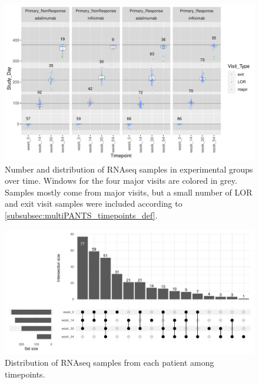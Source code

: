 \begin{figure}
    \centering
    \includegraphics[width=1.0\textwidth,page=1]{mainmatter/figures/chapter_04/process_pheno.pheno_filtered_dge.Study_Day_vs_Visit_Label.pdf}
    \caption{Number and distribution of \gls{RNAseq} samples in experimental groups over time. Windows for the four major visits are colored in grey. Samples mostly come from major visits, but a small number of \gls{LOR} and exit visit samples were included according to \autoref{subsubsec:multiPANTS_timepoints_def}.}
    \label{fig:multipants_studyDay_boxplots}
\end{figure}

\begin{figure}
    \centering
    \includegraphics[width=1.0\textwidth,page=1]{mainmatter/figures/chapter_04/process_pheno.pheno_filtered_dge.Visit_Label_upset.pdf}
    \caption{Distribution of \gls{RNAseq} samples from each patient among timepoints.}
    \label{fig:multipants_visits_upset}
\end{figure}



